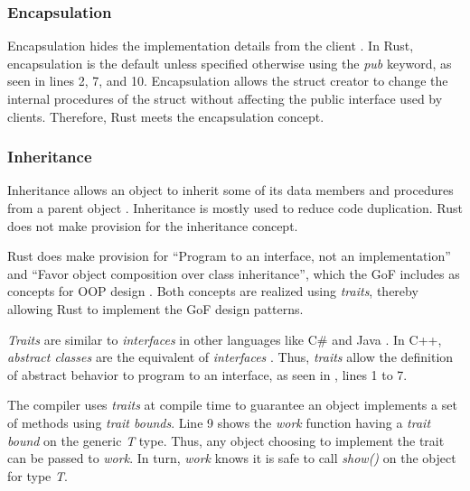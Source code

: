 \subsubsection{Encapsulation}
Encapsulation hides the implementation details from the client \cite{klabnik_2019_01,meyer_97_01,savitch_15_01}.
In Rust, encapsulation is the default unless specified otherwise using the \textit{pub} keyword, as seen in lines 2, 7, and 10.
Encapsulation allows the struct creator to change the internal procedures of the struct without affecting the public interface used by clients.
Therefore, Rust meets the encapsulation concept.

\subsubsection{Inheritance}
Inheritance allows an object to inherit some of its data members and procedures from a parent object \cite{meyer_97_01,stefik_85_01,gamma_94_01,savitch_15_01}.
Inheritance is mostly used to reduce code duplication.
Rust does not make provision for the inheritance concept.

Rust does make provision for ``Program to an interface, not an implementation'' and ``Favor object composition over class inheritance'', which the GoF includes as concepts for OOP design \cite{gamma_94_01}.
Both concepts are realized using \textit{traits}, thereby allowing Rust to implement the GoF design patterns.

\textit{Traits} are similar \cite{klabnik_2019_01} to \textit{interfaces} in other languages like C\# \cite{robinson_04_01} and Java \cite{gosling_96_01}.
In C++, \textit{abstract classes} are the equivalent of \textit{interfaces} \cite{malik_09_01,stroustrup_13_01,alexandrescu_01_01}.
Thus, \textit{traits} allow the definition of abstract behavior to program to an interface, as seen in , lines 1 to 7.


The compiler uses \textit{traits} at compile time to guarantee an object implements a set of methods using \textit{trait bounds}.
Line 9 shows the \textit{work} function having a \textit{trait bound} on the generic \textit{T} type.
Thus, any object choosing to implement the  trait can be passed to \textit{work}.
In turn, \textit{work} knows it is safe to call \textit{show()} on the object for type \textit{T}.

